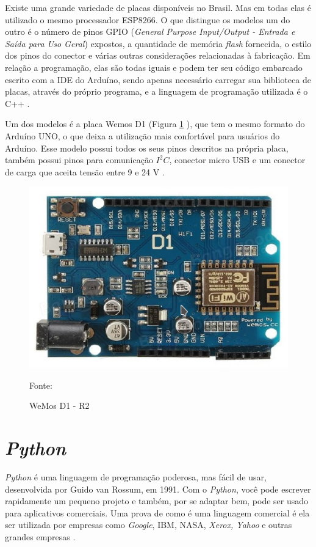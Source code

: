Existe uma grande variedade de placas disponíveis no Brasil.  Mas em todas elas é utilizado o mesmo processador ESP8266. O que distingue os modelos um do outro é o número de pinos GPIO (\textit{General Purpose Input/Output - Entrada e Saída para Uso Geral}) expostos, a quantidade de memória \textit{flash} fornecida, o estilo dos pinos do conector e várias outras considerações relacionadas à fabricação.  Em relação a  programação, elas são todas iguais e podem ter seu código embarcado escrito com a IDE do Arduíno, sendo apenas necessário carregar sua biblioteca de placas, através do próprio programa, e a linguagem de programação utilizada é o C++  \cite{kolban2016}.

Um dos modelos é a placa Wemos D1 (Figura \ref{wemosd1} ), que tem o mesmo formato do Arduíno UNO, o que deixa a utilização mais confortável para usuários do Arduíno. Esse modelo possui todos os seus pinos descritos na própria placa, também possui pinos para comunicação $I^2C$, conector micro USB e um conector de carga que aceita tensão entre 9 e 24 V \cite{kolban2016}\cite{wemos2017}.

\begin{figure}[h!]
	\centering
	\includegraphics[keepaspectratio=true,scale=0.7
	]{figuras/wemosd1.png}
	\caption{ WeMos D1 - R2 }
	Fonte: \cite{wemos2017}
	\label{wemosd1}	
\end{figure}

\section{\textit{Python}}

\textit{Python} é uma linguagem de programação poderosa, mas fácil de usar, desenvolvida por Guido van Rossum, em 1991. Com o \textit{Python}, você pode escrever rapidamente um pequeno projeto e também, por se adaptar bem, pode ser usado para aplicativos comerciais. Uma prova de como é uma linguagem comercial é ela ser utilizada por empresas como \textit{Google}, IBM, NASA, \textit{Xerox, Yahoo} e outras grandes empresas \cite{dawson2010}.

